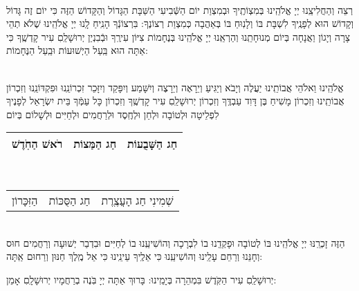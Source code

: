 \documentclass[twoside, openany, parskip=half, 11pt]{book}
\begin{document}
\begin{sometimes}

\\
רְצֵה וְהַחֲלִיצֵֽנוּ יְיָ אֱלֹהֵֽינוּ בְּמִצְוֹתֶֽיךָ וּבְמִצְוַת יוֹם הַשְּֿׁבִיעִי הַשַּׁבָּת הַגָּדוֹל וְהַקָּדוֹשׁ הַזֶּה כִּי יוֹם זֶה גָּדוֹל וְקָדוֹשׁ הוּא לְפָנֶֽיךָ לִשְׁבָּת בּוֹ וְלָנֽוּחַ בּוֹ בְּאַהֲבָה כְּמִצְוַת רְצוֹנֶךָ: בִּרְצוֹנְֿךָ הָנִֽיחַ לָֽנוּ יְיָ אֱלֹהֵֽינוּ שֶׁלֹא תְהֵי צָרָה וְיָגוֹן וַאֲנָחָה בְּיוֹם מְנוּחָתֵֽנוּ וְהַרְאֵֽנוּ יְיָ אֱלֹהֵֽינוּ בְּנֶחָמוֹת צִיּוֹן עִירֶֽךָ וּבְֿבִנְיַן יְרוּשָׁלַֽםִ עִיר קָדְשֶֽׁךָ כִּי אַתָּה הוּא בַּֽעַל הַיְשׁוּעוֹת וּבַֽעַל הַנֶּחָמוֹת: 


\sepline %


\\
אֱלֹהֵֽינוּ וֵאלֹהֵי אֲבוֹתֵֽינוּ יַעֲלֶה וְיָבֹא וְיַגִּיעַ וְיֵרָאֶה וְיֵרָצֶה וְיִשָּׁמַע וְיִפָּקֵד וְיִזָּכֵר זִכְרוֹנֵֽנוּ וּפִקְדּוֹנֵֽנוּ וְזִכְרוֹן אֲבוֹתֵֽינוּ וְזִכְרוֹן מָשִׁיחַ בֶּן דָּוִד עַבְדֶּֽךָ וְזִכְרוֹן יְרוּשָׁלַֽםִ עִיר קָדְשֶֽׁךָ וְזִכְרוֹן כָּל עַמְּֿךָ בֵּית יִשְׂרָאֵל לְפָנֶיךָ לִפְלֵיטָה וּלְטוֹבָה וּלְחֵן וּלְחֶֽסֶד וּלְרַחֲמִים וּלְחַיִּים וּלְשָׁלוֹם בְּיוֹם\\ 
\begin{tabular}{c|c|c}
 רֹאשׁ הַחֹֽדֶשׁ & חַג הַמַּצוֹת & חַג הַשָּׁבֻעוֹת\\ \hline
 \end{tabular}\\
\begin{tabular}{c|c|c}
 הַזִּכָּרוֹן & חַג הַסֻּכּוֹת & שְׁמִינִי חַג הָעֲצֶֽרֶת
\end{tabular}\\
הַזֶּה זָכְרֵֽנּוּ יְיָ אֱלֹהֵֽינוּ בּוֹ לְטוֹבָה וּפָקְדֵֽנוּ בוֹ לִבְרָכָה וְהוֹשִׁיעֵֽנוּ בוֹ לְחַיִּים וּבִדְבַר יְשׁוּעָה וְרַחֲמִים חוּס וְחָנֵּנוּ וְרַחֵם עָלֵֽינוּ וְהוֹשִׁיעֵֽנוּ כִּי אֵלֶֽיךָ עֵינֵֽינוּ כִּי אֵל מֶֽלֶךְ חַנּוּן וְרַחוּם אַֽתָּה:

\end{sometimes}

 יְרוּשָׁלַֽםִ עִיר הַקֹּֽדֶשׁ בִּמְהֵרָה בְּיָמֵֽינוּ: בָּרוּךְ אַתָּה יְיָ בֹּֽנֶה בְרַחֲמָיו יְרוּשָׁלָֽםִ אָמֵן:
\end{document}
